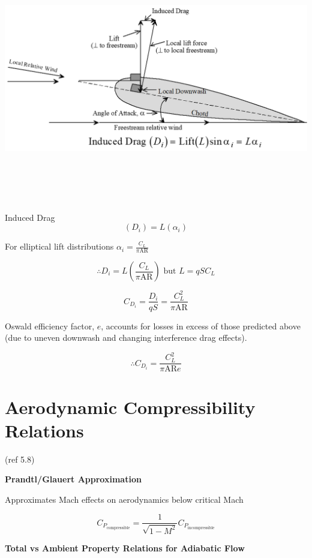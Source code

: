 \documentclass[
]{book}
\begin{document}
\includegraphics[width=8.8in,height=4.25in]{media/05/image51.png}

Induced Drag \[\left(D_i\right)=L\left(\alpha_i\right)\]

For elliptical lift distributions \(\alpha_i = \frac{C_L}{\pi \mathrm{AR}}\)

\[\therefore D_i = L \left(\frac{C_L}{\pi \mathrm{AR}}\right) \text{ but } L=qSC_L \]

\[C_{D_i} = \frac{D_i}{qS} = \frac{C_L^2}{\pi \mathrm{AR}}\]

Oswald efficiency factor, \(e\), accounts for losses in excess of those predicted above (due to uneven downwash and changing interference drag effects).

\[\therefore C_{D_i} = \frac{C_L^2}{\pi \mathrm{AR} e}\]

\hypertarget{aerodynamic-compressibility-relations}{%
\section{Aerodynamic Compressibility Relations}\label{aerodynamic-compressibility-relations}}

(ref 5.8)

\textbf{Prandtl/Glauert Approximation}

Approximates Mach effects on aerodynamics below critical Mach

\[C_{P_{\mathrm{compressible}}} = \frac{1}{\sqrt{1-M^2}}C_{P_{\mathrm{incompressible}}} \]

\textbf{Total vs Ambient Property Relations for Adiabatic Flow}
\end{document}
